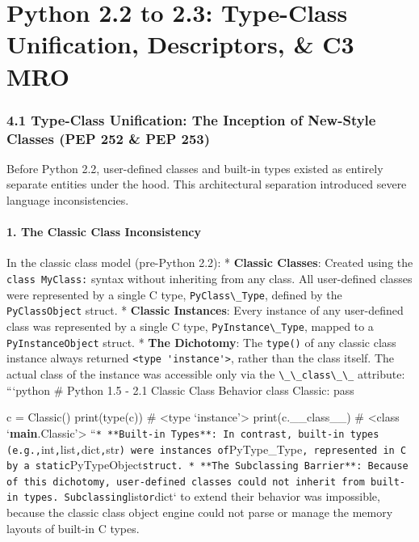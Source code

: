\hypertarget{python-2.2-to-2.3-type-class-unification-descriptors-c3-mro}{%
\chapter{Python 2.2 to 2.3: Type-Class Unification, Descriptors, \& C3
MRO}\label{python-2.2-to-2.3-type-class-unification-descriptors-c3-mro}}

\hypertarget{type-class-unification-the-inception-of-new-style-classes-pep-252-pep-253}{%
\subsection{4.1 Type-Class Unification: The Inception of New-Style
Classes (PEP 252 \& PEP
253)}\label{type-class-unification-the-inception-of-new-style-classes-pep-252-pep-253}}

Before Python 2.2, user-defined classes and built-in types existed as
entirely separate entities under the hood. This architectural separation
introduced severe language inconsistencies.

\hypertarget{the-classic-class-inconsistency}{%
\subsubsection{1. The Classic Class
Inconsistency}\label{the-classic-class-inconsistency}}

In the classic class model (pre-Python 2.2): * \textbf{Classic Classes}:
Created using the \passthrough{\lstinline!class MyClass:!} syntax
without inheriting from any class. All user-defined classes were
represented by a single C type, \passthrough{\lstinline!PyClass\_Type!},
defined by the \passthrough{\lstinline!PyClassObject!} struct. *
\textbf{Classic Instances}: Every instance of any user-defined class was
represented by a single C type,
\passthrough{\lstinline!PyInstance\_Type!}, mapped to a
\passthrough{\lstinline!PyInstanceObject!} struct. * \textbf{The
Dichotomy}: The \passthrough{\lstinline!type()!} of any classic class
instance always returned \passthrough{\lstinline!<type 'instance'>!},
rather than the class itself. The actual class of the instance was
accessible only via the \passthrough{\lstinline!\_\_class\_\_!}
attribute: ```python \# Python 1.5 - 2.1 Classic Class Behavior class
Classic: pass

c = Classic() print(type(c)) \# \textless type `instance'\textgreater{}
print(c.\_\_class\_\_) \# \textless class
`\textbf{main}.Classic'\textgreater{}
``\passthrough{\lstinline!* **Built-in Types**: In contrast, built-in types (e.g.,!}int\passthrough{\lstinline!,!}list\passthrough{\lstinline!,!}dict\passthrough{\lstinline!,!}str\passthrough{\lstinline!) were instances of!}PyType\_Type\passthrough{\lstinline!, represented in C by a static!}PyTypeObject\passthrough{\lstinline!struct. * **The Subclassing Barrier**: Because of this dichotomy, user-defined classes could not inherit from built-in types. Subclassing!}list\passthrough{\lstinline!or!}dict`
to extend their behavior was impossible, because the classic class
object engine could not parse or manage the memory layouts of built-in C
types.


